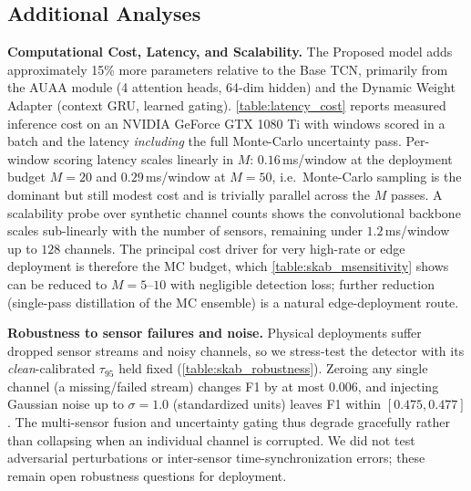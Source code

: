 \subsection{Additional Analyses}

\textbf{Computational Cost, Latency, and Scalability.} The Proposed model adds approximately 15\% more parameters relative to the Base TCN, primarily from the AUAA module (4 attention heads, 64-dim hidden) and the Dynamic Weight Adapter (context GRU, learned gating). \cref{table:latency_cost} reports measured inference cost on an NVIDIA GeForce GTX 1080 Ti with windows scored in a batch and the latency \emph{including} the full Monte-Carlo uncertainty pass. Per-window scoring latency scales linearly in $M$: $0.16$\,ms/window at the deployment budget $M=20$ and $0.29$\,ms/window at $M=50$, i.e.\ Monte-Carlo sampling is the dominant but still modest cost and is trivially parallel across the $M$ passes. A scalability probe over synthetic channel counts shows the convolutional backbone scales sub-linearly with the number of sensors, remaining under $1.2$\,ms/window up to $128$ channels. The principal cost driver for very high-rate or edge deployment is therefore the MC budget, which \cref{table:skab_msensitivity} shows can be reduced to $M=5$--$10$ with negligible detection loss; further reduction (single-pass distillation of the MC ensemble) is a natural edge-deployment route.



\textbf{Robustness to sensor failures and noise.} Physical deployments suffer dropped sensor streams and noisy channels, so we stress-test the detector with its \emph{clean}-calibrated $\tau_{95}$ held fixed (\cref{table:skab_robustness}). Zeroing any single channel (a missing/failed stream) changes F1 by at most $0.006$, and injecting Gaussian noise up to $\sigma=1.0$ (standardized units) leaves F1 within $[0.475, 0.477]$. The multi-sensor fusion and uncertainty gating thus degrade gracefully rather than collapsing when an individual channel is corrupted. We did not test adversarial perturbations or inter-sensor time-synchronization errors; these remain open robustness questions for deployment.



